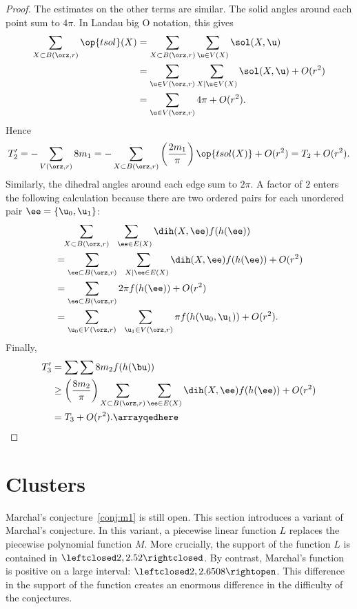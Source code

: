 \begin{proof}
The estimates on the other terms are similar.  The solid angles
around each point sum to $4\pi$.
In Landau big O notation, this gives
\begin{align*} 
\sum_{X\subset B(\orz,r)} \op{tsol}(X) &= 
\sum_{X\subset B(\orz,r)} \sum_{ \u\in V( X)} \sol(X, \u)\\
&=\sum_{ \u\in  V(\orz,r)} \sum_{X\mid  \u\in V( X)} \sol(X, \u) + O(r^2)\\
&=\sum_{ \u\in  V(\orz,r)} 4\pi    + O(r^2).
\end{align*}
Hence
\[  
T_2' = -\sum_{ V(\orz,r)} 8 m_1 = 
-\sum_{X\subset B(\orz,r)}\left(\frac{2m_1}\pi\right) 
\op{tsol(X)} + O(r^2) = T_2 + O(r^2).
\] 
Similarly, the dihedral angles around each edge sum to $2\pi$.  A
factor of $2$ enters the following calculation because there are two
ordered pairs for each unordered pair $\ee=\{ \u_0, \u_1\}$:
\begin{align*} 
&\phantom{=}\sum_{X\subset B(\orz,r)} 
\sum_{~~\ee\in E(X)} \dih(X,\ee)  f(h(\ee)) \vspace{3pt}\\
&=\sum_{\ee\subset B(\orz,r)} 
\sum_{~~X\mid \ee\in E(X)} \dih(X,\ee)  f(h(\ee)) +O(r^2)\vspace{3pt}\\
&=\sum_{\ee\subset B(\orz,r)} 2\pi f(h(\ee)) + O(r^2)\vspace{3pt} \\
&=\sum_{ \u_0\in  V(\orz,r)} 
\sum_{~~\u_1\in  V(\orz,r) } \pi f(h( \u_0, \u_1)) + O(r^2).\\
\end{align*}
Finally,
\arrayqed
\begin{align*} 
T_3' &= \sum\sum 8 m_2 f(h(\bu)) \\
&\ge \left(\frac{8m_2}\pi\right)
\sum_{X\subset B(\orz,r)}\sum_{\ee\in E(X)}\dih(X,\ee) f(h(\ee)) + O(r^2) \\
&= T_3 + O(r^2).\arrayqedhere
\end{align*}
\end{proof}




\section{Clusters}

Marchal's conjecture~\ref{conj:m1} is still open.  This section
introduces a variant of Marchal's conjecture.  In this variant, a
piecewise linear function $L$ replaces the piecewise polynomial
function $M$.  More crucially, the support of the function $L$ is
contained in $\leftclosed2,2.52\rightclosed$.  By contrast, Marchal's
function is positive on a large interval:
$\leftclosed2,2.6508\rightopen$.  This difference in the support of
the function creates an enormous difference in the difficulty of the
conjectures.


